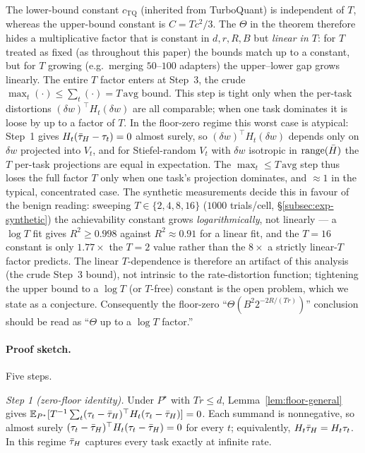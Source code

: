 \begin{remark}
\label{rem:tgap}
The lower-bound constant $c_{\mathrm{TQ}}$ (inherited from
TurboQuant) is independent of $T$, whereas the upper-bound
constant is $C = Tc^2/3$. The $\Theta$ in the theorem therefore
hides a multiplicative factor that is constant in $d, r, R, B$ but
\emph{linear in $T$}: for $T$ treated as fixed (as throughout this
paper) the bounds match up to a constant, but for $T$ growing
(e.g.\ merging $50$--$100$ adapters) the upper--lower gap grows
linearly. The entire $T$ factor enters at Step~3, the crude
$\max_t (\cdot) \leq \sum_t(\cdot) = T\,\mathrm{avg}$ bound. This
step is tight only when the per-task distortions
$(\delta w)^\top H_t (\delta w)$ are all comparable; when one task
dominates it is loose by up to a factor of $T$. In the floor-zero
regime this worst case is atypical: Step~1 gives
$H_t(\bar{\tau}_H - \tau_t) = 0$ almost surely, so
$(\delta w)^\top H_t(\delta w)$ depends only on $\delta w$
projected into $V_t$, and for Stiefel-random $V_t$ with $\delta w$
isotropic in $\operatorname{range}(\bar H)$ the $T$ per-task projections are
equal in expectation. The $\max_t \leq T\,\mathrm{avg}$ step thus
loses the full factor $T$ only when one task's projection
dominates, and $\approx 1$ in the typical, concentrated case. The
synthetic measurements decide this in favour of the benign reading:
sweeping $T \in \{2,4,8,16\}$ ($1000$ trials/cell,
\S\ref{subsec:exp-synthetic}) the achievability constant grows
\emph{logarithmically}, not linearly --- a $\log T$ fit gives
$R^2 \geq 0.998$ against $R^2 \approx 0.91$ for a linear fit, and the
$T{=}16$ constant is only $1.77\times$ the $T{=}2$ value rather than
the $8\times$ a strictly linear-$T$ factor predicts. The linear
$T$-dependence is therefore an artifact of this analysis (the crude
Step~3 bound), not intrinsic to the rate-distortion function;
tightening the upper bound to a $\log T$ (or $T$-free) constant is the
open problem, which we state as a conjecture. Consequently the
floor-zero ``$\Theta(B^2 2^{-2R/(Tr)})$'' conclusion should be read as
``$\Theta$ up to a $\log T$ factor.''
\end{remark}

\paragraph{Proof sketch.} Five steps.

\emph{Step 1 (zero-floor identity).} Under $P^\star$ with
$Tr\leq d$, Lemma~\ref{lem:floor-general} gives
$\mathbb{E}_{P^\star}[T^{-1}\sum_t(\tau_t-\bar{\tau}_H)^\top H_t(\tau_t-\bar{\tau}_H)]
= 0$. Each summand is nonnegative, so almost surely
$(\tau_t - \bar{\tau}_H)^\top H_t(\tau_t-\bar{\tau}_H) = 0$ for every $t$;
equivalently, $H_t\bar{\tau}_H = H_t\tau_t$. In this regime $\bar{\tau}_H$
captures every task exactly at infinite rate.

